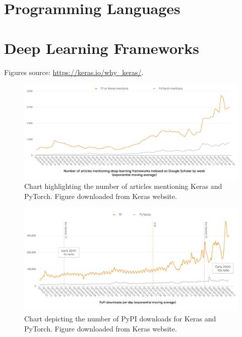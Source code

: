 \section{Programming Languages}
\label{sec:appendix-programming-languages-comparison}



\section{Deep Learning Frameworks}
\label{sec:appendix-keras_vs_pytorch}

Figures source: \url{https://keras.io/why_keras/}.

\begin{figure}[ht]
\centerline{\includegraphics[width=1.1\textwidth]{figures/appendix/keras_vs_pytorch_mentions.jpeg}}
\caption{Chart highlighting the number of articles mentioning Keras and PyTorch. Figure downloaded from Keras website.}
\end{figure}

\begin{figure}[ht]
\centerline{\includegraphics[width=1.1\textwidth]{figures/appendix/keras_vs_pytorch_downloads.jpg}}
\caption{Chart depicting the number of PyPI downloads for Keras and PyTorch. Figure downloaded from Keras website.}
\end{figure}